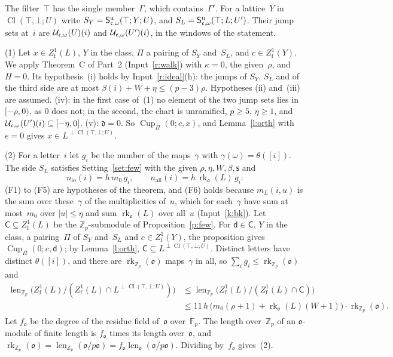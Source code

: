 \documentclass[11pt,a4paper]{article}
\makeatletter
\newcommand{\m}[1]{\mbox{$#1$}}        %
\theoremstyle{plainx}
\theoremstyle{uprightx}
\renewenvironment{proof}[1][Proof]{\par\pushQED{\qed}\normalfont\topsep0pt\partopsep0pt
  \trivlist\item[\hskip\labelsep\itshape #1.]\ignorespaces}{\popQED\endtrivlist\@endpefalse}
\providecommand{\Zp}{\mathbb{Z}_p}\providecommand{\Qp}{\mathbb{Q}_p}\providecommand{\GQp}{G_{\mathbb{Q}_p}}
\providecommand{\fo}{\mathfrak{o}}\providecommand{\fc}{\mathfrak{c}}\providecommand{\fd}{\mathfrak{d}}
\providecommand{\CupB}[4]{\operatorname{Cup}_{#1}(#2;#3,#4)}
\providecommand{\InCl}[3]{\operatorname{Cl}(#1,#2;#3)}
\providecommand{\cupOrth}[2]{{#2}^{\perp#1}}
\providecommand{\relLen}[3]{\operatorname{len}_{#1}\bigl(#2/(#2\cap#3)\bigr)}
\makeatother
\begin{document}
\begin{proof}[Proof of Theorem A]
The filter~$\top$ has the single member~$\Gamma$, which contains~$\Gamma'$. For a lattice~$Y$ in
$\InCl{\top}{\bot}{U}$ write $S_Y=\univS{\fc}{\omega}{\top}{Y;U}$, and $S_L=\univS{\fc}{\omega}{\top}{L;U'}$. Their
jump sets at~$i$ are $\letterJ{\fc}{\omega}{U}{i}$ and $\letterJ{\fc}{\omega}{U'}{i}$, in the windows of
the statement.

(1) Let $x\in Z^{1}_{\mathrm{f}}(L)$, $Y$ in the class, $\Pi$ a pairing of $S_Y$ and~$S_L$, and
$c\in Z^{1}_{\mathrm{f}}(Y)$. We apply Theorem~C of Part~2 (Input~\ref{r:walk}) with \m{\kappa=0}, the
given~$\rho$, and \m{H=0}. Its hypothesis~(i) holds by Input~\ref{r:ideal}(h): the jumps of $S_Y$, $S_L$ and
of the third side are at most $\beta(i)+W+\eta\le(p-3)\rho$. Hypotheses (ii) and~(iii) are assumed. (iv):
in the first case of~(1) no element of the two jump sets lies in \m{[-\rho,0)}, as $0$ does not; in the
second, the chart is unramified, \m{p\ge5}, \m{\eta\ge1}, and
$\letterJ{\fc}{\omega}{U'}{i}\subseteq[-\eta,0]$. (v): \m{\fd=0}. So $\CupB{\Pi}{0}{c}{x}$, and
Lemma~\ref{l:orth} with \m{e=0} gives $x\in\cupOrth{\InCl{\top}{\bot}{U}}{L}$.

(2) For a letter~$i$ let $g_i$ be the number of the maps~$\gamma$ with $\gamma(\omega)=\theta([i])$. The side
$S_L$ satisfies Setting~\ref{set:few} with the given $\rho,\eta,W,\beta,\mathsf{s}$ and
\[n_{\mathrm{lo}}(i)=h\,m_0\,g_i,\qquad n_{\mathrm{all}}(i)=h\,\operatorname{rk}_{\fo}(L)\,g_i :\]
(F1) to (F5) are hypotheses of the theorem, and (F6) holds because \m{m_L(i,u)} is the sum over these~$\gamma$
of the multiplicities of~$u$, which for each~$\gamma$ have sum at most~$m_0$ over \m{|u|\le\eta} and sum
$\operatorname{rk}_{\fo}(L)$ over all~$u$ (Input~\ref{k:bk}). Let $\mathsf{C}\subseteq Z^{1}_{\mathrm{f}}(L)$ be the
$\Zp$-submodule of Proposition~\ref{p:few}. For \m{\mathsf{d}\in \mathsf{C}}, $Y$ in the class, a pairing~$\Pi$ of $S_Y$
and~$S_L$ and $c\in Z^{1}_{\mathrm{f}}(Y)$, the proposition gives $\CupB{\Pi}{0}{c}{\mathsf{d}}$; by
Lemma~\ref{l:orth}, $\mathsf{C}\subseteq\cupOrth{\InCl{\top}{\bot}{U}}{L}$. Distinct letters have distinct
\m{\theta([i])}, and there are $\operatorname{rk}_{\Zp}(\fo)$ maps~$\gamma$ in all, so
$\sum_ig_i\le\operatorname{rk}_{\Zp}(\fo)$ and
\begin{align*}\relLen{\Zp}{Z^{1}_{\mathrm{f}}(L)}{\cupOrth{\InCl{\top}{\bot}{U}}{L}}&\le\relLen{\Zp}{Z^{1}_{\mathrm{f}}(L)}{\mathsf{C}}\\
&\le11\,h\,\bigl(m_0(\rho+1)+\operatorname{rk}_{\fo}(L)(W+1)\bigr)\cdot\operatorname{rk}_{\Zp}(\fo).\end{align*}
Let \m{f_{\fo}} be the degree of the residue field of~$\fo$ over~$\mathbb{F}_p$. The length over~$\Zp$ of an
$\fo$-module of finite length is $f_{\fo}$ times its length over~$\fo$, and
$\operatorname{rk}_{\Zp}(\fo)=\operatorname{len}_{\Zp}(\fo/p\fo)=f_{\fo}\operatorname{len}_{\fo}(\fo/p\fo)$.
Dividing by~$f_{\fo}$ gives~(2).
\end{proof}
\end{document}

